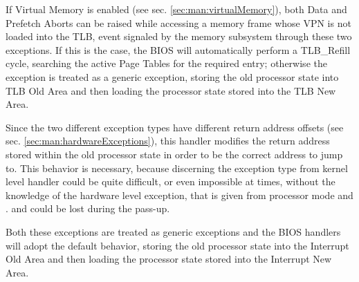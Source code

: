 
If Virtual Memory is enabled (see sec. \ref{sec:man:virtualMemory}), both Data and Prefetch Aborts can be raised while accessing a memory frame whose VPN is not loaded into the TLB, event signaled by the memory subsystem through these two exceptions.
If this is the case, the BIOS will automatically perform a TLB\_Refill cycle, searching the active Page Tables for the required entry; otherwise the exception is treated as a generic exception, storing the old processor state into TLB Old Area and then loading the processor state stored into the TLB New Area.

Since the two different exception types have different return address offsets (see sec. \ref{sec:man:hardwareExceptions}), this handler modifies the return address stored within the old processor state in order to be the correct address to jump to.
This behavior is necessary, because discerning the exception type from kernel level handler could be quite difficult, or even impossible at times, without the knowledge of the hardware level exception, that is given from processor mode and . and could be lost during the pass-up.


Both these exceptions are treated as generic exceptions and the BIOS handlers will adopt the default behavior, storing the old processor state into the Interrupt Old Area and then loading the processor state stored into the Interrupt New Area.


